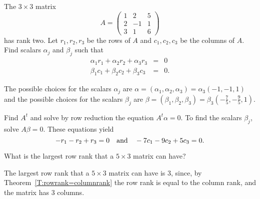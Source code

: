 \documentclass{ximera}
\begin{document}
\begin{exercise} \label{c5.8.1}
The $3\times 3$ matrix
\[
A = \left(\begin{array}{rrr} 1 & 2 & 5\\ 2 & -1 & 1\\ 3 & 1 & 6
\end{array}\right)
\]
has rank two.  Let $r_1,r_2,r_3$ be the rows of $A$ and
$c_1,c_2,c_3$ be the columns of $A$. Find scalars $\alpha_j$ and
$\beta_j$ such that
\begin{eqnarray*}
\alpha_1r_1+\alpha_2r_2+\alpha_3r_3 & = & 0 \\
\beta_1c_1+\beta_2c_2+\beta_3c_3 & = & 0.
\end{eqnarray*}

\begin{solution}

\ans The possible choices for the scalars $\alpha_j$ are
$\alpha = (\alpha_1,\alpha_2,\alpha_3) = \alpha_3(-1,-1,1)$ and
the possible choices for the scalars $\beta_j$ are $\beta = 
(\beta_1,\beta_2,\beta_3) = \beta_3(-\frac{7}{5},-\frac{9}{5},1)$.

\soln Find $A^t$ and solve by row reduction the equation
$A^t\alpha = 0$.  To find the scalars $\beta_j$, solve $A\beta =
0$.  These equations yield
\[
-r_1 - r_2 + r_3 = 0 \quad\mbox{and}\quad -7c_1 - 9c_2 + 5c_3 = 0.
\]

\end{solution}
\end{exercise}

\begin{exercise} \label{c5.8.2}
What is the largest row rank that a $5\times 3$ matrix can have?

\begin{solution}
The largest row rank that a $5 \times 3$ matrix can have
is $3$, since, by Theorem~\ref{T:rowrank=columnrank} the row rank is
equal to the column rank, and the matrix has $3$ columns.

\end{solution}
\end{exercise}
\end{document}
